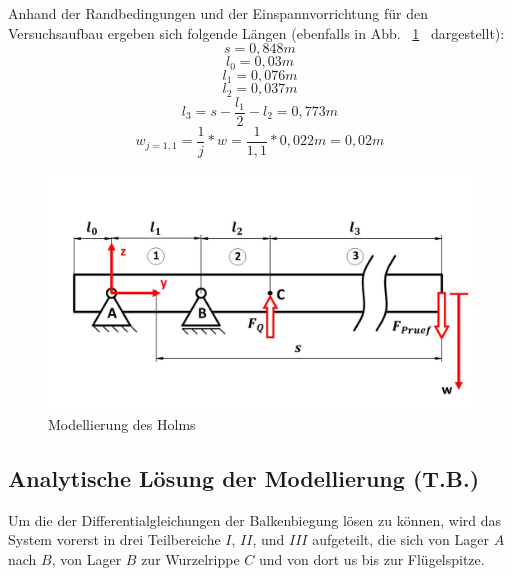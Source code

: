 \noindent Anhand der Randbedingungen und der Einspannvorrichtung für den Versuchsaufbau ergeben sich folgende Längen (ebenfalls in Abb. ~\ref{fig:Holmmodellierung}~ dargestellt): 
\begin{equation}
	s = 0,848 m
\end{equation}
\begin{equation}
	l_{0} = 0,03 m
\end{equation}
\begin{equation}
	l_{1} = 0,076 m
\end{equation}
\begin{equation}
	l_{2} = 0,037 m 
\end{equation}
\begin{equation}
	l_{3} = s - \frac{l_{1}}{2} - l_{2} = 0,773 m
\end{equation}
\begin{equation}
	w_{j=1,1} = \frac{1}{j} * w = \frac{1}{1,1} * 0,022 m = 0,02 m
\end{equation}
\begin{figure}
	\includegraphics[width=1.0\textwidth]{Bilder/Balkenmodell.jpg}
	\caption{Modellierung des Holms}
	\label{fig:Holmmodellierung}
\end{figure}

\subsection{Analytische Lösung der Modellierung (T.B.)}
Um die der Differentialgleichungen der Balkenbiegung lösen zu können, wird das System vorerst in drei Teilbereiche $I$, $II$, und $III$ aufgeteilt, die sich von Lager $A$ nach $B$, von Lager $B$ zur Wurzelrippe $C$ und von dort us bis zur Flügelspitze. \\

